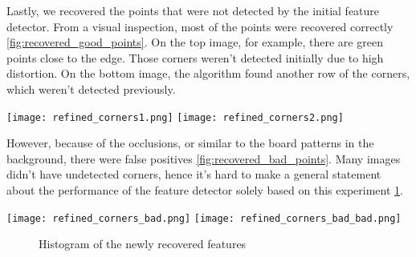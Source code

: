 \begin{minipage}[t]{0.3\linewidth}
	Lastly, we recovered the points that were not detected by the initial feature
	detector.
	From a visual inspection, most of the points were recovered correctly
	\cref{fig:recovered_good_points}.
	On the top image, for example, there are green points close to the edge.
	Those corners weren't detected initially due to high distortion. On the bottom
	image, the algorithm found another row of the corners, which weren't detected previously.
\end{minipage}
\hfill
\begin{minipage}[t]{0.6\linewidth}
	\texttt{[image: refined\_corners1.png]}
	\texttt{[image: refined\_corners2.png]}

	\label{fig:recovered_good_points}
\end{minipage}

\begin{minipage}[t]{0.3\linewidth}
	However,
	because of the occlusions, or similar to the board patterns in the background,
	there were false positives \cref{fig:recovered_bad_points}. Many images didn't
	have undetected corners, hence it's hard to make a general statement about the
	performance of the feature detector solely based on this experiment
	\cref{fig:recovered_points_histogram}.
\end{minipage}
\hfill
\begin{minipage}[t]{0.6\linewidth}
	\texttt{[image: refined\_corners\_bad.png]}
	\texttt{[image: refined\_corners\_bad\_bad.png]}
	\label{fig:recovered_bad_points}
\end{minipage}

\begin{figure}[h]
	\caption{Histogram of the newly recovered features}
	\label{fig:recovered_points_histogram}
\end{figure}


